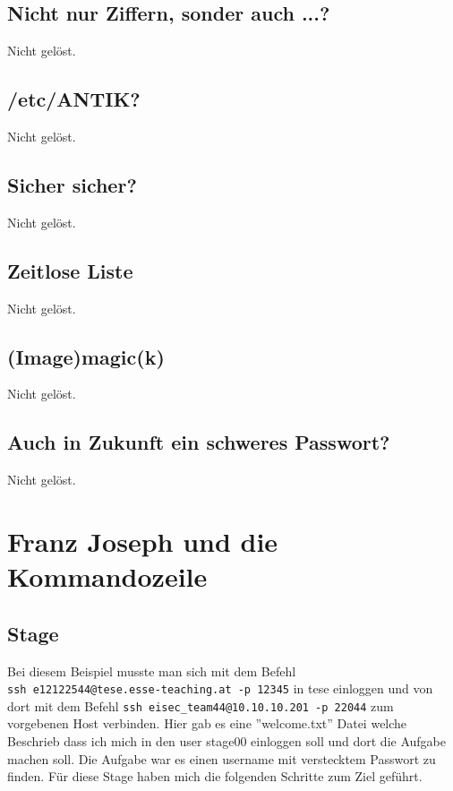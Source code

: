 \documentclass[12pt, a4paper, titlepage, oneside]{scrartcl}
\begin{document}
	\subsection{Nicht nur Ziffern, sonder auch ...?}
	Nicht gelöst.

	\subsection{/etc/ANTIK?}
	Nicht gelöst.

	\subsection{Sicher sicher?}
	Nicht gelöst.

	\subsection{Zeitlose Liste}
	Nicht gelöst.

	\subsection{(Image)magic(k)}
	Nicht gelöst.

	\subsection{Auch in Zukunft ein schweres Passwort?}
	Nicht gelöst.

	\section{Franz Joseph und die Kommandozeile}

	\subsection{Stage}
	Bei diesem Beispiel musste man sich mit dem Befehl \\ \lstinline{ssh e12122544@tese.esse-teaching.at -p 12345}
	in tese einloggen und von dort mit dem Befehl \lstinline{ssh eisec_team44@10.10.10.201 -p 22044}
	zum vorgebenen Host verbinden. Hier gab es eine ''welcome.txt'' Datei welche
	Beschrieb dass ich mich in den user stage00 einloggen soll und dort die
	Aufgabe machen soll. Die Aufgabe war es einen username mit verstecktem Passwort
	zu finden. Für diese Stage haben mich die folgenden Schritte zum Ziel geführt.
\end{document}
